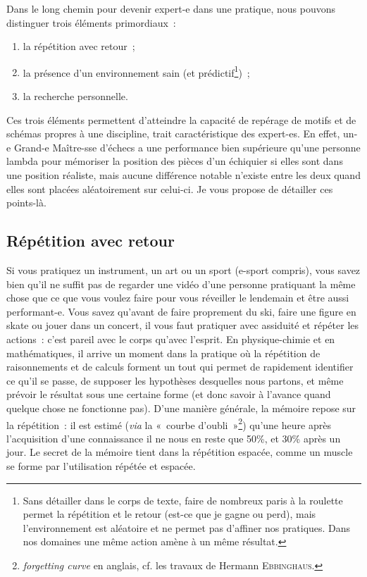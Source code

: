 Dans le long chemin pour devenir expert-e dans une pratique, nous pouvons
distinguer trois éléments primordiaux~:
\begin{enumerate}
	\item la répétition avec retour~;
	\item la présence d'un environnement sain (et prédictif\footnote{Sans
		      détailler dans le corps de texte, faire de nombreux paris à la
		      roulette permet la répétition et le retour (est-ce que je gagne ou
		      perd), mais l'environnement est aléatoire et ne permet pas d'affiner
		      nos pratiques. Dans nos domaines une même action amène à un même
		      résultat.})~;
	\item la recherche personnelle.
\end{enumerate}

Ces trois éléments permettent d'atteindre la capacité de repérage de motifs et
de schémas propres à une discipline, trait caractéristique des expert-es. En
effet, un-e Grand-e Maître-sse d'échecs a une performance bien supérieure qu'une
personne lambda pour mémoriser la position des pièces d'un échiquier si elles
sont dans une position réaliste, mais aucune différence notable n'existe entre
les deux quand elles sont placées aléatoirement sur celui-ci. Je vous propose de
détailler ces points-là.

\subsection{Répétition avec retour}

Si vous pratiquez un instrument, un art ou un sport (e-sport compris), vous
savez bien qu'il ne suffit pas de regarder une vidéo d'une personne pratiquant
la même chose que ce que vous voulez faire pour vous réveiller le lendemain et
être aussi performant-e. Vous savez qu'avant de faire proprement du ski, faire
une figure en skate ou jouer dans un concert, il vous faut pratiquer avec
assiduité et répéter les actions~: c'est pareil avec le corps qu'avec l'esprit.
En physique-chimie et en mathématiques, il arrive un moment dans la pratique où
la répétition de raisonnements et de calculs forment un tout qui permet de
rapidement identifier ce qu'il se passe, de supposer les hypothèses desquelles
nous partons, et même prévoir le résultat sous une certaine forme (et donc
savoir à l'avance quand quelque chose ne fonctionne pas). D'une manière
générale, la mémoire repose sur la répétition~: il est estimé (\textit{via} la
«~courbe d'oubli~»\footnote{\textit{forgetting curve} en anglais, cf. les
	travaux de Hermann \textsc{Ebbinghaus}.}) qu'une heure après l'acquisition
d'une connaissance il ne nous en reste que 50\%, et 30\% après un jour. Le
secret de la mémoire tient dans la répétition espacée, comme un muscle se forme
par l'utilisation répétée et espacée.

